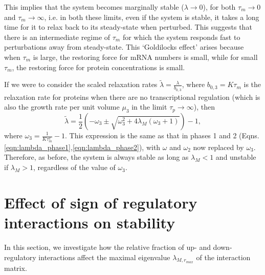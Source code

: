 \documentclass[10pt]{article}
\begin{document}
This implies that the system becomes marginally stable ($\lambda \to 0$), for both $\tau_m \rightarrow 0$ and $\tau_m \rightarrow \infty$, i.e. in both these limits, even if the system is stable, it takes a long time for it to relax back to its steady-state when perturbed. This suggests that there is an intermediate regime of $\tau_m$ for which the system responds fast to perturbations away from steady-state. This `Goldilocks effect' arises because when $\tau_m$ is large, the restoring force for mRNA numbers is small, while for small $\tau_m$, the restoring force for protein concentrations is small.

If we were to consider the scaled relaxation rates $\tilde{\lambda} = \frac{\lambda}{b_{0,3}}$, where $b_{0,3} = K \tau_m$ is the relaxation rate for proteins when there are no transcriptional regulation (which is also the growth rate per unit volume $\mu_3$ in the limit $\tau_p \to \infty$), then
\begin{equation}
    \tilde{\lambda} = \frac{1}{2}\left(-\omega_3 \pm \sqrt{\omega_3^2 + 4 \lambda_M (\omega_3+1)} \right) - 1,
    \label{eqn:lambdatilde_phase3}
\end{equation}
where $\omega_3 = \frac{1}{K\tau_m^2}-1$. This expression is the same as that in phases 1 and 2 (Eqns.\ref{eqn:lambda_phase1},\ref{eqn:lambda_phase2}), with $\omega$ and $\omega_2$ now replaced by $\omega_3$. Therefore, as before, the system is always stable as long as $\lambda_M < 1$ and unstable if $\lambda_M > 1$, regardless of the value of $\omega_3$.

\section{Effect of sign of regulatory interactions on stability}
\label{sec:IntSignEffect}

In this section, we investigate how the relative fraction of up- and down- regulatory interactions affect the maximal eigenvalue $\lambda_{M,r_{max}}$ of the interaction matrix. 
\end{document}
